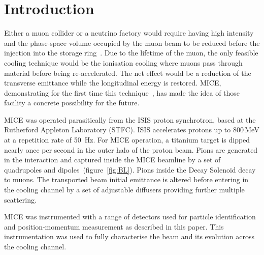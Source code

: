 \section{Introduction}
\label{Sect:Intro}

Either a muon collider or a neutrino factory would require having high intensity and the phase-space volume occupied by the muon beam to be reduced before the injection into the storage ring~\cite{Geer:1998PhRvD..57.6989G}.
Due to the lifetime of the muon, the only feasible cooling technique would be the ionisation cooling \cite{Neuffer:1983jr} where muons pass through material before being re-accelerated. The net effect would be a reduction of the transverse emittance while the longitudinal energy is restored.
MICE, demonstrating for the first time this technique~\cite{Bogomilov:2019kfj}, has made the idea of those facility a concrete possibility for the future.
  
  
MICE was operated parasitically from the ISIS proton synchrotron, based at the Rutherford Appleton Laboratory (STFC).
ISIS accelerates protons up to 800\,MeV at a repetition rate of 50~Hz. For MICE operation, a titanium target is dipped nearly once per second in the outer halo of the proton beam.
Pions are generated in the interaction and captured inside the MICE beamline by a set of quadrupoles and dipoles~(figure~\ref{fig:BL}). Pions inside the Decay Solenoid decay to muons.
The transported beam initial emittance is altered before entering in the cooling channel by a set of adjustable diffusers providing further multiple scattering.

MICE was instrumented with a range of detectors used for particle identification and position-momentum measurement as described in this paper. 
This instrumentation was used to fully characterise the beam and its evolution across the cooling channel.
